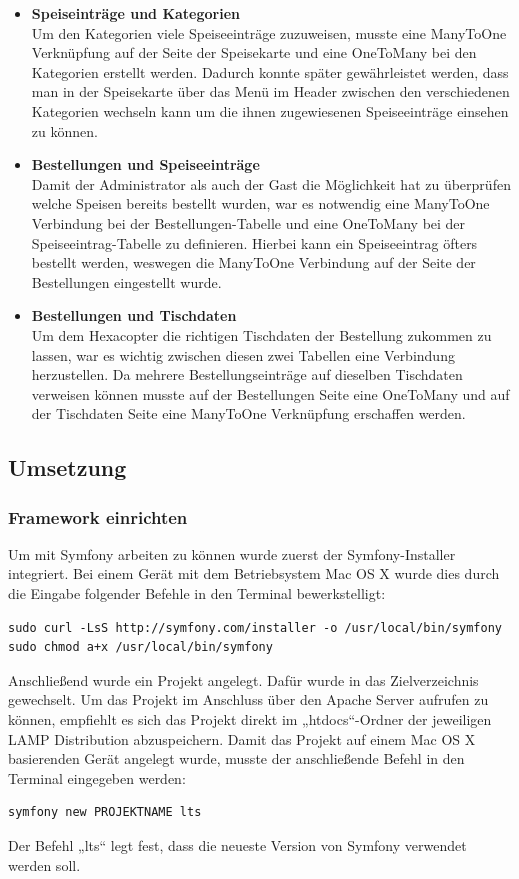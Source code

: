 \begin{itemize}
    \item \textbf{Speiseinträge und Kategorien}\\
Um den Kategorien viele Speiseeinträge zuzuweisen, musste eine ManyToOne Verknüpfung auf der Seite der Speisekarte und eine OneToMany bei den Kategorien erstellt werden. Dadurch konnte später gewährleistet werden, dass man in der Speisekarte über das Menü im Header zwischen den verschiedenen Kategorien wechseln kann um die ihnen zugewiesenen Speiseeinträge einsehen zu können.
    \item \textbf{Bestellungen und Speiseeinträge}\\
Damit der Administrator als auch der Gast die Möglichkeit hat zu überprüfen welche Speisen bereits bestellt wurden, war es notwendig eine ManyToOne Verbindung bei der Bestellungen-Tabelle und eine OneToMany bei der Speiseeintrag-Tabelle zu definieren. Hierbei kann ein Speiseeintrag öfters bestellt werden, weswegen die ManyToOne Verbindung auf der Seite der Bestellungen eingestellt wurde.
    \item \textbf{Bestellungen und Tischdaten}\\
Um dem Hexacopter die richtigen Tischdaten der Bestellung zukommen zu lassen, war es wichtig zwischen diesen zwei Tabellen eine Verbindung herzustellen. Da mehrere Bestellungseinträge auf dieselben Tischdaten verweisen können musste auf der Bestellungen Seite eine OneToMany und auf der Tischdaten Seite eine ManyToOne Verknüpfung erschaffen werden.
  \end{itemize}

  \subsection{Umsetzung}

    \subsubsection{Framework einrichten}

Um mit Symfony arbeiten zu können wurde zuerst der Symfony-Installer integriert. Bei einem Gerät mit dem Betriebsystem Mac OS X wurde dies durch die Eingabe folgender Befehle in den Terminal bewerkstelligt:
	\lstset{language = bash}
  	\begin{lstlisting}
sudo curl -LsS http://symfony.com/installer -o /usr/local/bin/symfony
sudo chmod a+x /usr/local/bin/symfony
  	\end{lstlisting}
Anschließend wurde ein Projekt angelegt. Dafür wurde in das Zielverzeichnis gewechselt. Um das Projekt im Anschluss über den Apache Server aufrufen zu können, empfiehlt es sich das Projekt direkt im „htdocs“-Ordner der jeweiligen LAMP Distribution abzuspeichern. Damit das Projekt auf einem Mac OS X basierenden Gerät angelegt wurde, musste der anschließende Befehl in den Terminal eingegeben werden:
	\lstset{language = bash}
  	\begin{lstlisting}
symfony new PROJEKTNAME lts
  	\end{lstlisting}
Der Befehl „lts“ legt fest, dass die neueste Version von Symfony verwendet werden soll.

